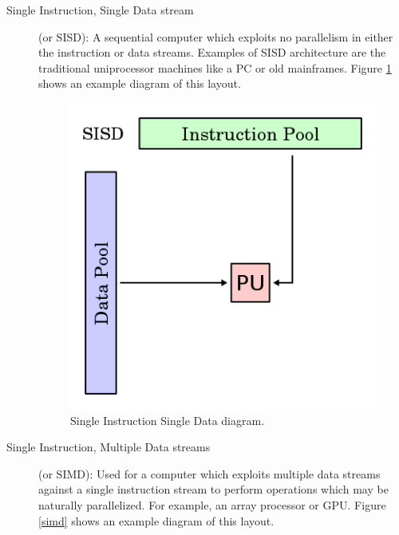 \documentclass[a4paper,12pt,english]{report}
\begin{document}
\begin{description}
\item [Single Instruction, Single Data stream] (or SISD): A sequential computer which exploits no parallelism in either the instruction or data streams. Examples of SISD architecture are the traditional uniprocessor machines like a PC or old mainframes. Figure \ref{sisd} shows an example diagram of this layout.
\begin{figure}[!ht]
\begin{center}
\includegraphics [bb= 0 0 200 200]{images/SISD.png}
\end{center}
\caption{Single Instruction Single Data diagram.}
\label{sisd}
\end{figure}
\item [Single Instruction, Multiple Data streams] (or SIMD): Used for a computer which exploits multiple data streams against a single instruction stream to perform operations which may be naturally parallelized. For example, an array processor or GPU. Figure \ref{simd} shows an example diagram of this layout.


\end{description}
\end{document}

